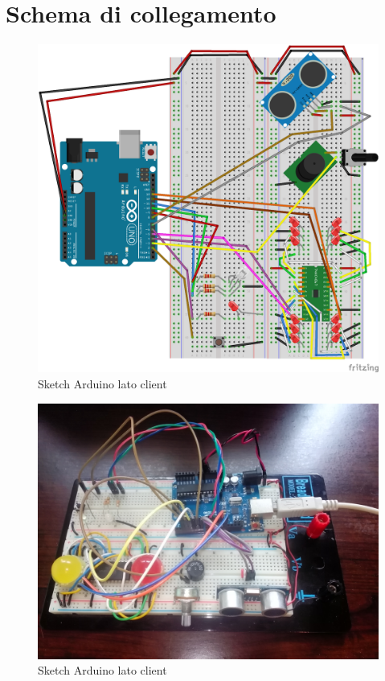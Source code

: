 \chapter{Schema di collegamento}
\begin{figure}[!ht]
	\centering
	\includegraphics[scale=.60]{img/SketchClient_img.png}
	\caption{Sketch Arduino lato client}
\end{figure}

\begin{figure}[!ht]
	\centering
	\includegraphics[scale=.08]{img/real1.jpg}
	\caption{Sketch Arduino lato client}
\end{figure}

